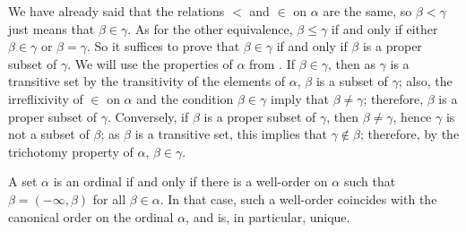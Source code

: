 \documentclass{article}
\begin{document}
We have already said that the relations \(<\) and \(\in\) on
\(\alpha\) are the same, so \(\beta < \gamma\) just means that
\(\beta \in \gamma\).  As for the other equivalence,
\(\beta \leq \gamma\) if and only if either \(\beta \in \gamma\) or
\(\beta = \gamma\).  So it suffices to prove that \(\beta \in \gamma\)
if and only if \(\beta\) is a proper subset of \(\gamma\).  We will
use the properties of \(\alpha\) from .  If
\(\beta \in \gamma\), then as \(\gamma\) is a transitive set by the
transitivity of the elements of \(\alpha\), \(\beta\) is a subset of
\(\gamma\); also, the irreflixivity of \(\in\) on \(\alpha\) and the
condition \(\beta \in \gamma\) imply that \(\beta \neq \gamma\);
therefore, \(\beta\) is a proper subset of \(\gamma\).  Conversely, if
\(\beta\) is a proper subset of \(\gamma\), then
\(\beta \neq \gamma\), hence \(\gamma\) is not a subset of \(\beta\);
as \(\beta\) is a transitive set, this implies that
\(\gamma \notin \beta\); therefore, by the trichotomy property of
\(\alpha\), \(\beta \in \gamma\).

\begin{theorem}
  \label{thm:9hac1s0p}
  A set \(\alpha\) is an ordinal if and only if there is a well-order
  on \(\alpha\) such that \(\beta = (-\infty, \beta)\) for all
  \(\beta \in \alpha\).  In that case, such a well-order coincides
  with the canonical order on the ordinal \(\alpha\), and is, in
  particular, unique.
\end{theorem}
\end{document}

